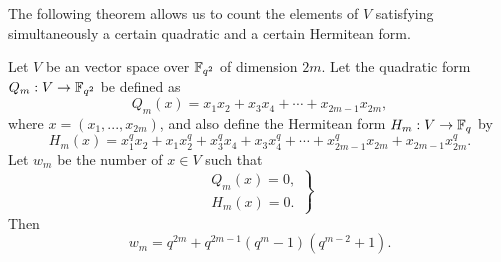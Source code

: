 The following theorem allows us to count the elements of $V$ satisfying simultaneously a 
certain quadratic and a certain Hermitean form.

	\begin{theorem}
		Let $V$ be an vector space over $\mathbb{F}_{q^2}$ of dimension $2m$. 
		Let the quadratic form $Q_m:V \rightarrow \mathbb{F}_{q^2}$ be defined as
		\begin{equation}
			Q_m(x) = x_1 x_2 + x_3 x_4 + \cdots + x_{2m-1} x_{2m},
		\end{equation}
		where $x = (x_1, ..., x_{2m})$, 
		and also define the Hermitean form $H_m:V \rightarrow \mathbb{F}_q$ by
		\begin{equation}
			H_m(x) = x_1^q x_2 + x_1 x_2^q + x_3^q x_4 + x_3 x_4^q + \cdots + x_{2m-1}^q x_{2m}
				+ x_{2m-1} x_{2m}^q.
		\end{equation}
		Let $w_m$ be the number of $x \in V$ such that
		\begin{equation}
			\label{eq:system1}
			\left.
				\begin{array}{l}
					Q_m(x) = 0, \\
					H_m(x) = 0.
				\end{array}
			\right\}
		\end{equation}
		Then
		\begin{equation}
			w_m = q^{2m} + q^{2m-1}(q^m-1)(q^{m-2}+1).
		\end{equation}
	\end{theorem}

